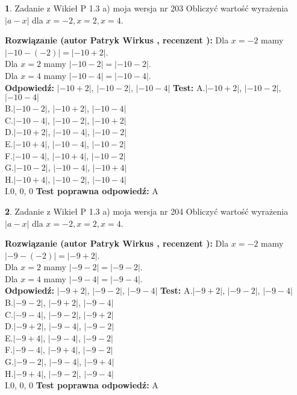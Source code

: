 \documentclass[12pt, a4paper]{article}
\theoremstyle{definition} %
\newtheorem{zad}{}
\newcommand{\zadStart}[1]{\begin{zad}#1\newline}
\newcommand{\zadStop}{\end{zad}}
\newcommand{\rozwStart}[2]{\noindent \textbf{Rozwiązanie (autor #1 , recenzent #2): }\newline}
\newcommand{\rozwStop}{\newline}
\newcommand{\odpStart}{\noindent \textbf{Odpowiedź:}\newline}
\newcommand{\odpStop}{\newline}
\newcommand{\testStart}{\noindent \textbf{Test:}\newline}
\newcommand{\testStop}{\newline}
\newcommand{\kluczStart}{\noindent \textbf{Test poprawna odpowiedź:}\newline}
\newcommand{\kluczStop}{\newline}
\begin{document}
\zadStart{Zadanie z Wikieł P 1.3 a) moja wersja nr 203}
Obliczyć wartość wyrażenia $|a - x|$ dla $x=-2,x=2,x=4$.
\zadStop
\rozwStart{Patryk Wirkus}{}
Dla $x = -2$ mamy $|-10 - (-2)| = |-10 + 2|$.\\
Dla $x = 2$ mamy $|-10 - 2| = |-10 - 2|$.\\
Dla $x = 4$ mamy $|-10 - 4| = |-10 - 4|$.\\
\rozwStop
\odpStart
$|-10 + 2|$, $|-10 - 2|$, $|-10 - 4|$
\odpStop
\testStart
A.$|-10 + 2|$, $|-10 - 2|$, $|-10 - 4|$\\
B.$|-10 - 2|$, $|-10 + 2|$, $|-10 - 4|$\\
C.$|-10 - 4|$, $|-10 - 2|$, $|-10 + 2|$\\
D.$|-10 + 2|$, $|-10 - 4|$, $|-10 - 2|$\\
E.$|-10 + 4|$, $|-10 - 4|$, $|-10 - 2|$\\
F.$|-10 - 4|$, $|-10 + 4|$, $|-10 - 2|$\\
G.$|-10 - 2|$, $|-10 - 4|$, $|-10 + 4|$\\
H.$|-10 + 4|$, $|-10 - 2|$, $|-10 - 4|$\\
I.$0$, $0$, $0$
\testStop
\kluczStart
A
\kluczStop



\zadStart{Zadanie z Wikieł P 1.3 a) moja wersja nr 204}
Obliczyć wartość wyrażenia $|a - x|$ dla $x=-2,x=2,x=4$.
\zadStop
\rozwStart{Patryk Wirkus}{}
Dla $x = -2$ mamy $|-9 - (-2)| = |-9 + 2|$.\\
Dla $x = 2$ mamy $|-9 - 2| = |-9 - 2|$.\\
Dla $x = 4$ mamy $|-9 - 4| = |-9 - 4|$.\\
\rozwStop
\odpStart
$|-9 + 2|$, $|-9 - 2|$, $|-9 - 4|$
\odpStop
\testStart
A.$|-9 + 2|$, $|-9 - 2|$, $|-9 - 4|$\\
B.$|-9 - 2|$, $|-9 + 2|$, $|-9 - 4|$\\
C.$|-9 - 4|$, $|-9 - 2|$, $|-9 + 2|$\\
D.$|-9 + 2|$, $|-9 - 4|$, $|-9 - 2|$\\
E.$|-9 + 4|$, $|-9 - 4|$, $|-9 - 2|$\\
F.$|-9 - 4|$, $|-9 + 4|$, $|-9 - 2|$\\
G.$|-9 - 2|$, $|-9 - 4|$, $|-9 + 4|$\\
H.$|-9 + 4|$, $|-9 - 2|$, $|-9 - 4|$\\
I.$0$, $0$, $0$
\testStop
\kluczStart
A
\kluczStop
\end{document}
